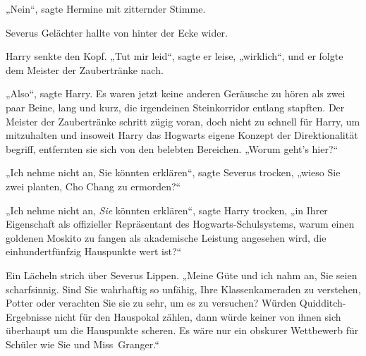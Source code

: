 „Nein“, sagte Hermine mit zitternder Stimme.

Severus Gelächter hallte von hinter der Ecke wider.

Harry senkte den Kopf. „Tut mir leid“, sagte er leise, „wirklich“, und er folgte dem Meister der Zaubertränke nach.

\later

„Also“, sagte Harry. Es waren jetzt keine anderen Geräusche zu hören als zwei paar Beine, lang und kurz, die irgendeinen Steinkorridor entlang stapften. Der Meister der Zaubertränke schritt zügig voran, doch nicht zu schnell für Harry, um mitzuhalten und insoweit Harry das Hogwarts eigene Konzept der Direktionalität begriff, entfernten sie sich von den belebten Bereichen. „Worum geht’s hier?“

„Ich nehme nicht an, Sie könnten erklären“, sagte Severus trocken, „wieso Sie zwei planten, Cho Chang zu ermorden?“

„Ich nehme nicht an, \emph{Sie} könnten erklären“, sagte Harry trocken, „in Ihrer Eigenschaft als offizieller Repräsentant des Hogwarts-Schulsystems, warum einen goldenen Moskito zu fangen als akademische Leistung angesehen wird, die einhundertfünfzig Hauspunkte wert ist?“

Ein Lächeln strich über Severus Lippen. „Meine Güte und ich nahm an, Sie seien scharfsinnig. Sind Sie wahrhaftig so unfähig, Ihre Klassenkameraden zu verstehen, Potter oder verachten Sie sie zu sehr, um es zu versuchen? Würden Quidditch-Ergebnisse nicht für den Hauspokal zählen, dann würde keiner von ihnen sich überhaupt um die Hauspunkte scheren. Es wäre nur ein obskurer Wettbewerb für Schüler wie Sie und Miss~Granger.“

